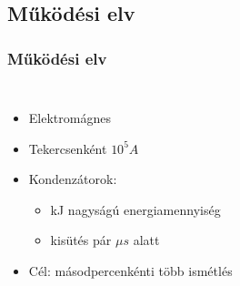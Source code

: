 \documentclass{beamer}
\begin{document}
\subsection{Működési elv}
\begin{frame}
    \frametitle{Működési elv}
    \begin{columns}
        \begin{itemize}
            \footnotesize
            \item Elektromágnes
            \item Tekercsenként $10^5A$
            \item Kondenzátorok: 
            \begin{itemize}
                \item kJ nagyságú energiamennyiség
                \item kisütés pár $\mu s$ alatt
            \end{itemize}
            \item Cél: másodpercenkénti több ismétlés
        \end{itemize}
    \end{columns}
\end{frame}
\end{document}
